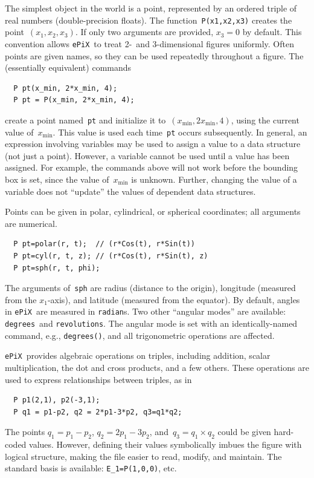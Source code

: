 \documentclass[12pt]{report}
\newcommand{\code}[1]{\texttt{#1}}
\newcommand{\ePiX}{\code{ePiX}}
\begin{document}
 The simplest object in the world is a point,
represented by an ordered triple of real numbers (double-precision
floats). The function~\code{P(x1,x2,x3)} creates the
point~$(x_1,x_2,x_3)$. If only two arguments are provided, $x_3=0$ by
default. This convention allows \ePiX\ to treat 2-~and 3-dimensional
figures uniformly.  Often points are given names, so they can be used
repeatedly throughout a figure.   The (essentially
equivalent) commands
\begin{verbatim}
  P pt(x_min, 2*x_min, 4);
  P pt = P(x_min, 2*x_min, 4);
\end{verbatim}
create a point named~\code{pt} and initialize it
to~$(x_\mathrm{min},2x_\mathrm{min},4)$, using the current value
of~$x_\mathrm{min}$. This value is used each time~\code{pt} occurs
subsequently.  In general, an expression involving variables may be
used to assign a value to a data structure (not just a point).
However, a variable cannot be used until a value has been assigned.
For example, the commands above will not work before the bounding box
is set, since the value of~$x_\mathrm{min}$ is unknown. Further,
changing the value of a variable does not ``update'' the values of
dependent data structures.

Points can be given in polar, cylindrical, or spherical coordinates;
all arguments are numerical.
\begin{verbatim}
  P pt=polar(r, t);  // (r*Cos(t), r*Sin(t))
  P pt=cyl(r, t, z); // (r*Cos(t), r*Sin(t), z)
  P pt=sph(r, t, phi);
\end{verbatim}
The arguments of~\code{sph} are radius (distance to the origin),
longitude (measured from the $x_1$-axis), and latitude (measured from
the equator).  By default, angles in \ePiX\ are
measured in \code{radian}s. Two other ``angular modes'' are available:
\code{degrees}~and \code{revolutions}. The angular mode is set with an
identically-named command, e.g., \code{degrees()}, and all
trigonometric operations are affected.

\ePiX\ provides algebraic operations on triples, including addition,
scalar multiplication, the dot and cross products, and a few others.
These operations are used to express relationships between triples, as
in
\begin{verbatim}
  P p1(2,1), p2(-3,1);
  P q1 = p1-p2, q2 = 2*p1-3*p2, q3=q1*q2;
\end{verbatim}
The points $q_1=p_1-p_2$, $q_2=2p_1-3p_2$, and~$q_3=q_1\times q_2$
could be given hard-coded values.  However, defining their values
symbolically imbues the figure with logical structure, making the file
easier to read, modify, and maintain. The standard basis is available:
\code{E\_1=P(1,0,0)}, etc.
\end{document}
